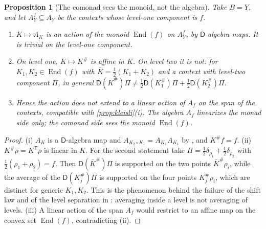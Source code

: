 \documentclass[11pt]{article}
\newtheorem{proposition}[theorem]{Proposition}
\theoremstyle{definition}
\theoremstyle{remark}
\newcommand{\D}{\mathsf{D}}
\newcommand{\T}{\mathsf T}
\begin{document}
\begin{proposition}[The comonad sees the monoid, not the algebra]\label{prop:comonad}
Take $B=Y$, and let $A^f_Y\subseteq A_Y$ be the contexts whose level-one component is $f$.
\begin{enumerate}[label=(\roman*)]
\item $K\mapsto A_K$ is an action of the monoid $\operatorname{End}(f)$ on $A^f_Y$, by $\D$-algebra maps. It is trivial on the level-one
  component.
\item On level one, $K\mapsto K^\#$ is affine in $K$. On level two it is not: for $K_1,K_2\in\operatorname{End}(f)$ with
  $\bar K=\frac12(K_1+K_2)$ and a context with level-two component $\Pi$, in general
  $\D(\bar K^\#)\Pi\ne\frac12\D(K_1^\#)\Pi+\frac12\D(K_2^\#)\Pi$.
\item Hence the action does not extend to a linear action of $A_f$ on the span of the contexts, compatible with
  \cref{prop:kleisli}(i). The algebra $A_f$ linearizes the monad side only; the comonad side sees the monoid
  $\operatorname{End}(f)$.
\end{enumerate}
\end{proposition}
\begin{proof}
(i) $A_K$ is a $\D$-algebra map and $A_{K_2\circ K_1}=A_{K_2}A_{K_1}$ by \cite[Prop.~9.14]{Tower}, and $K^\#f=f$. (ii) $K^\#\rho=K^\T\rho$ is linear in
$K$. For the second statement take $\Pi=\frac12\delta_{\rho_1}+\frac12\delta_{\rho_2}$ with $\frac12(\rho_1+\rho_2)=f$. Then
$\D(\bar K^\#)\Pi$ is supported on the two points $\bar K^\#\rho_i$, while the average of the $\D(K_j^\#)\Pi$ is supported on the four points
$K_j^\#\rho_i$, which are distinct for generic $K_1,K_2$. This is the phenomenon behind the failure of the shift law and of the level
separation in \cite[Thm.~8.3, Ex.~10.6]{Tower}: averaging inside a level is not averaging of levels. (iii) A linear action of the
span $A_f$ would restrict to an affine map on the convex set $\operatorname{End}(f)$, contradicting (ii).
\end{proof}
\end{document}
